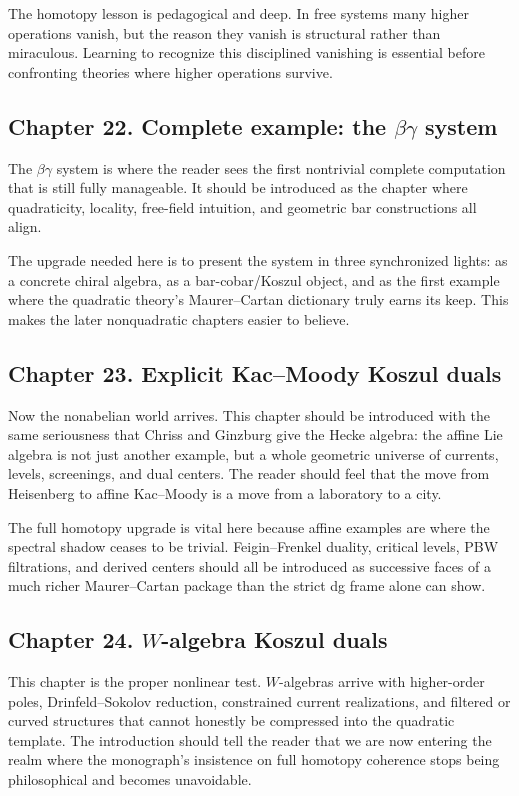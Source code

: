 The homotopy lesson is pedagogical and deep.  In free systems many higher operations vanish, but the reason they vanish is structural rather than miraculous.  Learning to recognize this disciplined vanishing is essential before confronting theories where higher operations survive.

\subsection*{Chapter 22. Complete example: the $\beta\gamma$ system}
The $\beta\gamma$ system is where the reader sees the first nontrivial complete computation that is still fully manageable.  It should be introduced as the chapter where quadraticity, locality, free-field intuition, and geometric bar constructions all align.

The upgrade needed here is to present the system in three synchronized lights: as a concrete chiral algebra, as a bar-cobar/Koszul object, and as the first example where the quadratic theory's Maurer--Cartan dictionary truly earns its keep.  This makes the later nonquadratic chapters easier to believe.

\subsection*{Chapter 23. Explicit Kac--Moody Koszul duals}
Now the nonabelian world arrives.  This chapter should be introduced with the same seriousness that Chriss and Ginzburg give the Hecke algebra: the affine Lie algebra is not just another example, but a whole geometric universe of currents, levels, screenings, and dual centers.  The reader should feel that the move from Heisenberg to affine Kac--Moody is a move from a laboratory to a city.

The full homotopy upgrade is vital here because affine examples are where the spectral shadow ceases to be trivial.  Feigin--Frenkel duality, critical levels, PBW filtrations, and derived centers should all be introduced as successive faces of a much richer Maurer--Cartan package than the strict dg frame alone can show.

\subsection*{Chapter 24. $W$-algebra Koszul duals}
This chapter is the proper nonlinear test.  $W$-algebras arrive with higher-order poles, Drinfeld--Sokolov reduction, constrained current realizations, and filtered or curved structures that cannot honestly be compressed into the quadratic template.  The introduction should tell the reader that we are now entering the realm where the monograph's insistence on full homotopy coherence stops being philosophical and becomes unavoidable.

